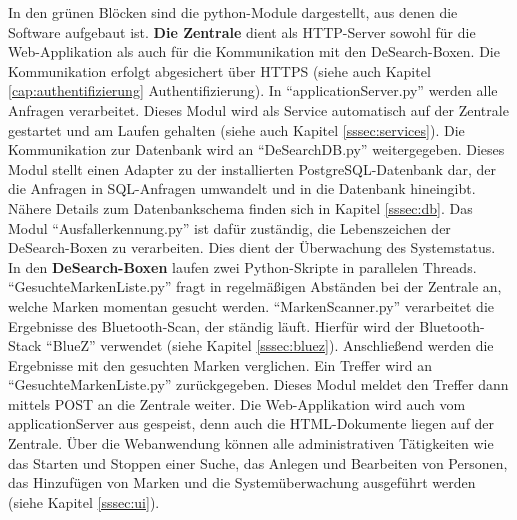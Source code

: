 In den grünen Blöcken sind die python-Module dargestellt, aus denen die Software aufgebaut ist. \textbf{Die Zentrale} dient als HTTP-Server sowohl für die Web-Applikation als auch für die Kommunikation mit den DeSearch-Boxen. Die Kommunikation erfolgt abgesichert über HTTPS (siehe auch Kapitel \ref{cap:authentifizierung} Authentifizierung). In \enquote{applicationServer.py} werden alle Anfragen verarbeitet. Dieses Modul wird als Service automatisch auf der Zentrale gestartet und am Laufen gehalten (siehe auch Kapitel \ref{sssec:services}). Die Kommunikation zur Datenbank wird an \enquote{DeSearchDB.py} weitergegeben. Dieses Modul stellt einen Adapter zu der installierten PostgreSQL-Datenbank dar, der die Anfragen in SQL-Anfragen umwandelt und in die Datenbank hineingibt. Nähere Details zum Datenbankschema finden sich in Kapitel \ref{sssec:db}. Das Modul \enquote{Ausfallerkennung.py} ist dafür zuständig, die Lebenszeichen der DeSearch-Boxen zu verarbeiten. Dies dient der Überwachung des Systemstatus.\\
In den \textbf{DeSearch-Boxen} laufen zwei Python-Skripte in parallelen Threads. \enquote{GesuchteMarkenListe.py} fragt in regelmäßigen Abständen bei der Zentrale an, welche Marken momentan gesucht werden. \enquote{MarkenScanner.py} verarbeitet die Ergebnisse des Bluetooth-Scan, der ständig läuft. Hierfür wird der Bluetooth-Stack \enquote{BlueZ} verwendet (siehe Kapitel \ref{sssec:bluez}). Anschließend werden die Ergebnisse mit den gesuchten Marken verglichen.  Ein Treffer wird an \enquote{GesuchteMarkenListe.py} zurückgegeben. Dieses Modul meldet den Treffer dann mittels POST an die Zentrale weiter. Die Web-Applikation wird auch vom applicationServer aus gespeist, denn auch die HTML-Dokumente liegen auf der Zentrale. Über die Webanwendung können alle administrativen Tätigkeiten wie das Starten und Stoppen einer Suche, das Anlegen und Bearbeiten von Personen, das Hinzufügen von Marken und die Systemüberwachung ausgeführt werden (siehe Kapitel \ref{sssec:ui}). 


